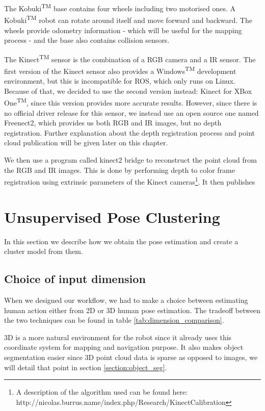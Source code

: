 The Kobuki\textsuperscript{TM} base contains four wheels including two motorised ones. A Kobuki\textsuperscript{TM} robot can rotate around itself and move forward and backward. The wheels provide odometry information - which will be useful for the mapping process - and the base also contains collision sensors.

The Kinect\textsuperscript{TM} sensor is the combination of a RGB camera and a IR sensor. The first version of the Kinect sensor also provides a Windows\textsuperscript{TM} development environment, but this is incompatible for ROS, which only runs on Linux. Because of that, we decided to use the second version instead: Kinect for XBox One\textsuperscript{TM}, since this version provides more accurate results\cite{kinect_comparison}. However, since there is no official driver release for this sensor, we instead use an open source one named Freenect2\cite{libfreenect2}, which provides us both RGB and IR images, but no depth registration. Further explanation about the depth registration process and point cloud publication will be given later on this chapter.

We then use a program called kinect2 bridge\cite{iai_kinect2} to reconstruct the point cloud from the RGB and IR images. This is done by performing depth to color frame registration using extrinsic parameters of the Kinect cameras\footnote{\raggedright A description of the algorithm used can be found here: http://nicolas.burrus.name/index.php/Research/KinectCalibration}.
It then publishes 

\section{Unsupervised Pose Clustering}
In this section we describe how we obtain the pose estimation and create a cluster model from them.

\subsection{Choice of input dimension}
When we designed our workflow, we had to make a choice between estimating human action either from 2D or 3D human pose estimation. The tradeoff between the two techniques can be found in table \ref{tab:dimension_comparison}.

3D is a more natural environment for the robot since it already uses this coordinate system for mapping and navigation purpose. It also makes object segmentation easier since 3D point cloud data is sparse as opposed to images, we will detail that point in section \ref{section:object_seg}.

